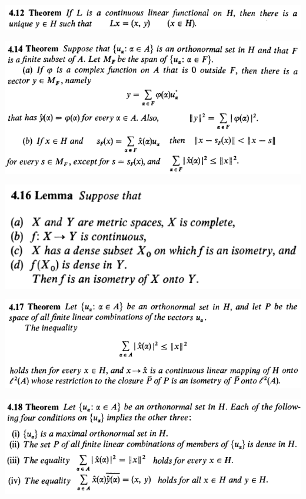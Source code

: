 \documentclass[12pt]{article}
\begin{document}
		\begin{center}
		\includegraphics{4ponto12}
		\end{center}

		\begin{center}
		\includegraphics{4ponto14}
		\end{center}

		\begin{center}
		\includegraphics{4ponto16}
		\end{center}

		\begin{center}
		\includegraphics{4ponto17}
		\end{center}

		\begin{center}
		\includegraphics{4ponto18}
		\end{center}
\end{document}
